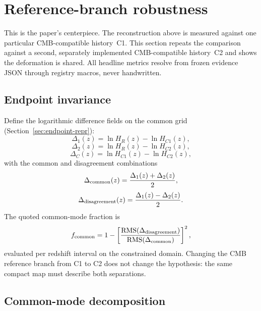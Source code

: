 \section{Reference-branch robustness}
\label{sec:triangulation}
\label{sec:robustness}

This is the paper's centerpiece. The reconstruction above is
measured against one particular CMB-compatible history~C1. This
section repeats the comparison against a second, separately implemented
CMB-compatible history~C2 and shows the deformation is
shared. All headline metrics resolve from frozen evidence JSON through
registry macros, never handwritten.

\subsection{Endpoint invariance}

Define the logarithmic difference fields on the common grid
(Section~\ref{sec:endpoint-repr}):
\begin{equation}
  \Delta_{1}(z)=\ln H_{R}(z)-\ln H_{C1}(z),
  \label{eq:delta1}
\end{equation}
\begin{equation}
  \Delta_{2}(z)=\ln H_{R}(z)-\ln H_{C2}(z),
  \label{eq:delta2}
\end{equation}
\begin{equation}
  \Delta_{C}(z)=\ln H_{C1}(z)-\ln H_{C2}(z),
  \label{eq:deltaC}
\end{equation}
with the common and disagreement combinations
\begin{equation}
  \Delta_{\rm common}(z) = \frac{\Delta_{1}(z)+\Delta_{2}(z)}{2},
  \label{eq:common}
\end{equation}
\begin{equation}
  \Delta_{\rm disagreement}(z) = \frac{\Delta_{1}(z)-\Delta_{2}(z)}{2}.
  \label{eq:disagreement}
\end{equation}
The quoted common-mode fraction is
\begin{equation}
  f_{\rm common}
  =
  1-
  \left[
  \frac{\mathrm{RMS}(\Delta_{\rm disagreement})}
       {\mathrm{RMS}(\Delta_{\rm common})}
  \right]^2,
  \label{eq:fcommon}
\end{equation}
evaluated per redshift interval on the constrained domain.
Changing the CMB reference branch from C1 to C2 does not change the
hypothesis: the same compact map must describe both separations.

\subsection{Common-mode decomposition}

